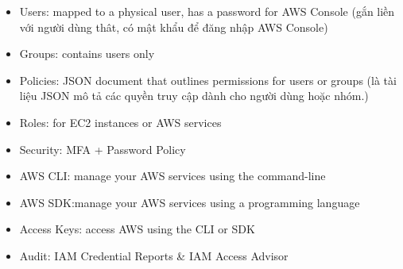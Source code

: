 \begin{itemize}
	\item Users: mapped to a physical user, has a password for AWS Console (gắn liền với người dùng thât, có mật khẩu để đăng nhập AWS Console)
	\item Groups: contains users only
	\item Policies: JSON document that outlines permissions for users or groups (là tài liệu JSON mô tả các quyền truy cập dành cho người dùng hoặc nhóm.)
	\item Roles: for EC2 instances or AWS services
	\item Security: MFA + Password Policy
	\item AWS CLI: manage your AWS services using the command-line
	\item AWS SDK:manage your AWS services using a programming language 
	\item Access Keys: access AWS using the CLI or SDK
	\item Audit: IAM Credential Reports \& IAM Access Advisor
\end{itemize}














































